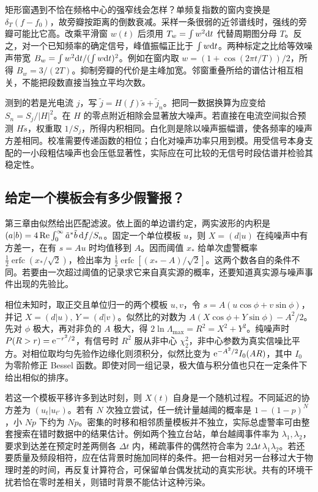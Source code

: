矩形窗遇到不恰在频格中心的强窄线会怎样？单频复指数的窗内变换是 $\delta_T(f-f_0)$，故旁瓣按距离的倒数衰减。采样一条很弱的近邻谱线时，强线的旁瓣可能比它高。改乘平滑窗 $w(t)$ 后须用 $T_w=\int w^2\dd t$ 代替周期图分母 $T$。反之，对一个已知频率的确定信号，峰值振幅正比于 $\int w\dd t$。两种标定之比给等效噪声带宽 $B_w=\int w^2\dd t/(\int w\dd t)^2$。例如在窗内取 $w=(1+\cos(2\pi t/T))/2$，所得 $B_w=3/(2T)$。抑制旁瓣的代价是主峰加宽。邻窗重叠所给的谱估计相互相关，不能把段数直接当独立平均次数。

测到的若是光电流 $j$，写 $\tilde j=H(f)\tilde s+\tilde j_n$。把同一数据换算为应变给 $S_n=S_j/|H|^2$。在 $H$ 的零点附近相除会显著放大噪声。若直接在电流空间拟合预测 $H\tilde s$，权重取 $1/S_j$，所得内积相同。白化则是除以噪声振幅谱，使各频率的噪声方差相同。校准需要传递函数的相位；白化对噪声功率只用到模。用受信号本身支配的一小段粗估噪声也会压低显著性，实际应在可比较的无信号时段估谱并检验其稳定性。

\subsection{给定一个模板会有多少假警报？}\label{sec:gw-b-match}
第三章由似然给出匹配滤波。依上面的单边谱约定，两实波形的内积是 $(a|b)=4\operatorname{Re}\int_0^\infty \tilde a^*\tilde b\,\dd f/S_n$。固定一个单位模板 $u$，则 $X=(d|u)$ 在纯噪声中有方差一，在有 $s=A u$ 时均值移到 $A$。因而阈值 $x_*$ 给单次虚警概率 $\tfrac12\operatorname{erfc}(x_*/\sqrt2)$，检出率为 $\tfrac12\operatorname{erfc}[(x_*-A)/\sqrt2]$。这两个数各自的条件不同。若要由一次超过阈值的记录求它来自真实源的概率，还要知道真实源与噪声事件出现的先验比。

相位未知时，取正交且单位归一的两个模板 $u,v$，令 $s=A(u\cos\phi+v\sin\phi)$，并记 $X=(d|u),\,Y=(d|v)$。似然比的对数为 $A(X\cos\phi+Y\sin\phi)-A^2/2$。先对 $\phi$ 极大，再对非负的 $A$ 极大，得 $2\ln\Lambda_{\max}=R^2=X^2+Y^2$。纯噪声时 $P(R>r)=\mathrm{e}^{-r^2/2}$，有信号时 $R^2$ 服从非中心 $\chi^2_2$，非中心参数为真实信噪比平方。对相位取均匀先验作边缘化则须积分，似然比变为 $\mathrm{e}^{-A^2/2}I_0(AR)$，其中 $I_0$ 为零阶修正 Bessel 函数。即使对同一组记录，极大值与积分值也只在一定条件下给出相似的排序。

若这一个模板平移许多到达时刻，则 $X(t)$ 自身是一个随机过程。不同延迟的协方差为 $(u_t|u_{t'})$。若有 $N$ 次独立尝试，任一统计量越阈的概率是 $1-(1-p)^N$，小 $Np$ 下约为 $Np$。密集的时移和相邻质量模板并不独立，实际总虚警率可由整套搜索在错时数据中的结果估计。例如两个独立台站，单台越阈事件率为 $\lambda_1,\lambda_2$，要求到达差在预定时差两侧各 $\Delta t$ 内，稀疏事件的偶然符合率为 $2\Delta t\,\lambda_1\lambda_2$。若还要质量及频段相符，应在估背景时施加同样的条件。把一台相对另一台移过大于物理时差的时间，再反复计算符合，可保留单台偶发扰动的真实形状。共有的环境干扰若恰在零时差相关，则错时背景不能估计这种污染。

